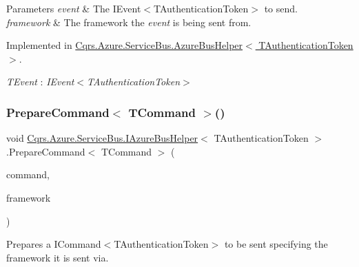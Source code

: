 \begin{DoxyParams}{Parameters}
{\em event} & The I\+Event$<$\+T\+Authentication\+Token$>$ to send.\\
\hline
{\em framework} & The framework the {\itshape event}  is being sent from.\\
\hline
\end{DoxyParams}


Implemented in \hyperlink{classCqrs_1_1Azure_1_1ServiceBus_1_1AzureBusHelper_ab0f6ff2ee04ad3b58e6713caebd3b560_ab0f6ff2ee04ad3b58e6713caebd3b560}{Cqrs.\+Azure.\+Service\+Bus.\+Azure\+Bus\+Helper$<$ T\+Authentication\+Token $>$}.

\begin{Desc}
\item[Type Constraints]\begin{description}
\item[{\em T\+Event} : {\em I\+Event$<$T\+Authentication\+Token$>$}]\end{description}
\end{Desc}
\mbox{\label{interfaceCqrs_1_1Azure_1_1ServiceBus_1_1IAzureBusHelper_ad25c4130a4357504cfccba49999493c7_ad25c4130a4357504cfccba49999493c7}} 
\subsubsection{\texorpdfstring{Prepare\+Command$<$ T\+Command $>$()}{PrepareCommand< TCommand >()}}
{\footnotesize\ttfamily void \hyperlink{interfaceCqrs_1_1Azure_1_1ServiceBus_1_1IAzureBusHelper}{Cqrs.\+Azure.\+Service\+Bus.\+I\+Azure\+Bus\+Helper}$<$ T\+Authentication\+Token $>$.Prepare\+Command$<$ T\+Command $>$ (\begin{DoxyParamCaption}\item[{T\+Command}]{command,  }\item[{string}]{framework }\end{DoxyParamCaption})}



Prepares a I\+Command$<$\+T\+Authentication\+Token$>$ to be sent specifying the framework it is sent via. 


